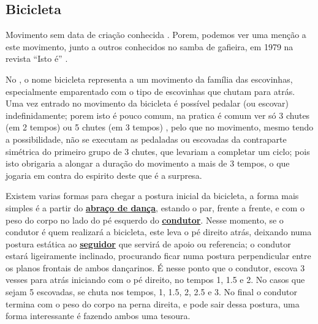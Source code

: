 \subsection{Bicicleta}

Movimento sem data de criação conhecida \cite[pp. 143,144]{perna2002samba}.
Porem, podemos ver uma menção a este movimento, junto a outros conhecidos no samba de gafieira, 
em 1979 na revista ``Isto é'' \cite[pp. 89]{revista1979isto}.

No \AnoLivro, o nome bicicleta representa a um movimento da família das escovinhas,
especialmente emparentado com o tipo de escovinhas que chutam para atrás.
Uma vez entrado no movimento da bicicleta é possível pedalar (ou escovar) indefinidamente;
porem isto é pouco comum, na pratica é comum ver só 3 chutes (em 2 tempos) ou 5 chutes (em 3 tempos) ,
pelo que no movimento, mesmo tendo a possibilidade, 
não se executam as pedaladas ou escovadas da contraparte simétrica do primeiro grupo de 3 chutes,
que levariam a completar um ciclo;
pois isto obrigaria a alongar a duração do movimento a mais de 3 tempos,
o que jogaria em contra do espirito deste que é a surpresa.

Existem varias formas para chegar a postura inicial da bicicleta,  
a forma mais simples é a partir do \hyperref[def:abracodedanca]{\textbf{abraço de dança}},
estando o par, frente a frente, 
e com o peso do corpo no lado do pé esquerdo do \hyperref[def:Condutor]{\textbf{condutor}}.
Nesse momento, se o condutor é quem realizará a bicicleta, 
este leva o pé direito atrás,
deixando numa postura estática ao \hyperref[def:Seguidor]{\textbf{seguidor}} 
que servirá de apoio ou referencia;   
o condutor estará ligeiramente inclinado,
procurando ficar numa postura perpendicular entre os planos frontais de ambos dançarinos.
É nesse ponto que o condutor, escova 3 vesses para atrás iniciando com o pé direito,
no tempos 1, 1.5 e 2. No casos que sejam 5 escovadas, se chuta nos tempos,
1, 1.5, 2, 2.5 e 3. No final o condutor termina com o peso do corpo na perna direita,
e pode sair dessa postura, uma forma interessante é fazendo ambos uma tesoura.




